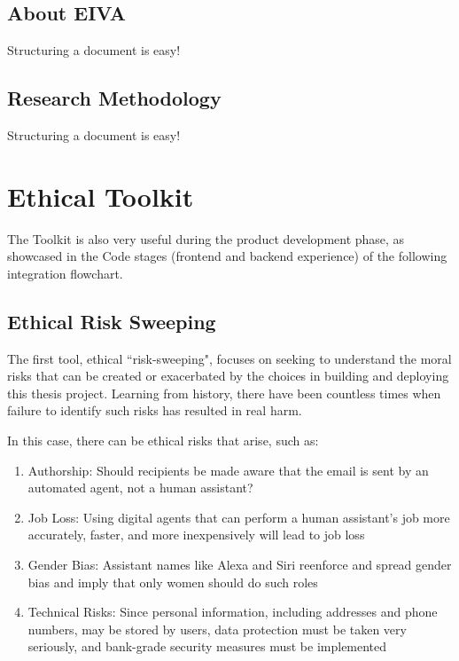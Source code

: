 \documentclass{article}
\begin{document}
\subsection{About EIVA}

Structuring a document is easy!

\subsection{Research Methodology}

Structuring a document is easy!

\section{Ethical Toolkit}

The Toolkit is also very useful during the product development phase, as showcased in the Code stages (frontend and backend experience) of the following integration flowchart.

\subsection{Ethical Risk Sweeping}

The first tool, ethical ``risk-sweeping", focuses on seeking to understand the moral risks that can be created or exacerbated by the choices in building and deploying this thesis project. Learning from history, there have been countless times when failure to identify such risks has resulted in real harm.

In this case, there can be ethical risks that arise, such as:

\begin{enumerate}
 \item Authorship: Should recipients be made aware that the email is sent by an automated agent, not a human assistant?
 \item Job Loss: Using digital agents that can perform a human assistant's job more accurately, faster, and more inexpensively will lead to job loss
 \item Gender Bias: Assistant names like Alexa and Siri reenforce and spread gender bias and imply that only women should do such roles
 \item Technical Risks: Since personal information, including addresses and phone numbers, may be stored by users, data protection must be taken very seriously, and bank-grade security measures must be implemented
\end{enumerate}
\end{document}
